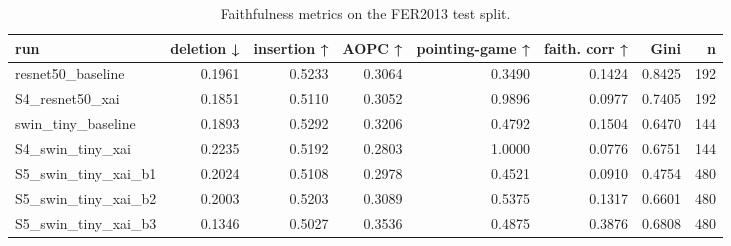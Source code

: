 \begin{table}[t]
\centering
\caption{Faithfulness metrics on the FER2013 test split.}
\label{tab:fai}
\begin{tabular}{lrrrrrrr}
\toprule
run & deletion ↓ & insertion ↑ & AOPC ↑ & pointing-game ↑ & faith. corr ↑ & Gini & n \\
\midrule
resnet50_baseline & 0.1961 & 0.5233 & 0.3064 & 0.3490 & 0.1424 & 0.8425 & 192 \\
S4_resnet50_xai & 0.1851 & 0.5110 & 0.3052 & 0.9896 & 0.0977 & 0.7405 & 192 \\
swin_tiny_baseline & 0.1893 & 0.5292 & 0.3206 & 0.4792 & 0.1504 & 0.6470 & 144 \\
S4_swin_tiny_xai & 0.2235 & 0.5192 & 0.2803 & 1.0000 & 0.0776 & 0.6751 & 144 \\
S5_swin_tiny_xai_b1 & 0.2024 & 0.5108 & 0.2978 & 0.4521 & 0.0910 & 0.4754 & 480 \\
S5_swin_tiny_xai_b2 & 0.2003 & 0.5203 & 0.3089 & 0.5375 & 0.1317 & 0.6601 & 480 \\
S5_swin_tiny_xai_b3 & 0.1346 & 0.5027 & 0.3536 & 0.4875 & 0.3876 & 0.6808 & 480 \\
\bottomrule
\end{tabular}
\end{table}
